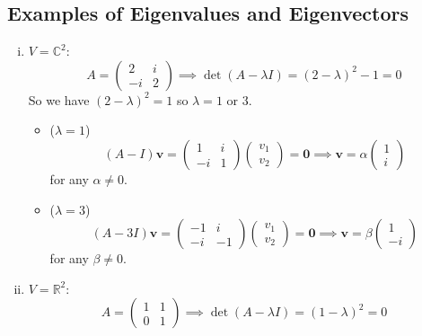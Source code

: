 \documentclass{article}
\begin{document}
\subsection{Examples of Eigenvalues and Eigenvectors}
\begin{enumerate}[(i)]
	\item $V = \mathbb C^2$:
	      \[ A = \begin{pmatrix}
			      2 & i \\ -i & 2
		      \end{pmatrix} \implies \det(A - \lambda I) = (2-\lambda)^2 - 1 = 0 \]
	      So we have $(2 - \lambda)^2 = 1$ so $\lambda = 1$ or 3.
	      \begin{itemize}
		      \item ($\lambda = 1$)
		            \[ (A - I)\bm v = \begin{pmatrix}
				            1 & i \\ -i & 1
			            \end{pmatrix}\begin{pmatrix}
				            v_1 \\ v_2
			            \end{pmatrix} = \bm 0 \implies \bm v = \alpha\begin{pmatrix}
				            1 \\ i
			            \end{pmatrix} \]
		            for any $\alpha \neq 0$.
		      \item ($\lambda = 3$)
		            \[ (A - 3I)\bm v = \begin{pmatrix}
				            -1 & i \\ -i & -1
			            \end{pmatrix}\begin{pmatrix}
				            v_1 \\ v_2
			            \end{pmatrix} = \bm 0 \implies \bm v = \beta\begin{pmatrix}
				            1 \\ -i
			            \end{pmatrix} \]
		            for any $\beta \neq 0$.
	      \end{itemize}
	\item $V = \mathbb R^2$:
	      \[ A = \begin{pmatrix}
			      1 & 1 \\ 0 & 1
		      \end{pmatrix} \implies \det(A - \lambda I) = (1-\lambda)^2 = 0 \]

\end{enumerate}
\end{document}
